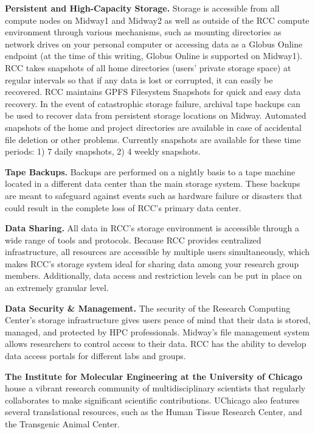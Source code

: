 \documentclass[onecolumn, compsoc,12pt]{IEEEtran}
\begin{document}
\textbf{Persistent and High-Capacity Storage.} Storage is accessible from all compute nodes on Midway1 and Midway2 as well as outside of the RCC compute environment through various mechanisms, such as mounting directories as network drives on your personal computer or accessing data as a Globus Online endpoint (at the time of this writing, Globus Online is supported on Midway1). RCC takes snapshots of all home directories (users' private storage space) at regular intervals so that if any data is lost or corrupted, it can easily be recovered. RCC maintains GPFS Filesystem Snapshots for quick and easy data recovery.  In the event of catastrophic storage failure, archival tape backups can be used to recover data from persistent storage locations on Midway. Automated snapshots of the home and project directories are available in case of accidental file deletion or other problems. Currently snapshots are available for these time periods: 1) 7 daily snapshots, 2) 4 weekly snapshots.

\textbf{Tape Backups.} Backups are performed on a nightly basis to a tape machine located in a different data center than the main storage system. These backups are meant to safeguard against events such as hardware failure or disasters that could result in the complete loss of RCC’s primary data center.


\textbf{Data Sharing.} All data in RCC’s storage environment is accessible through a wide range of tools and protocols. Because RCC provides centralized infrastructure, all resources are accessible by multiple users simultaneously, which makes RCC’s storage system ideal for sharing data among your research group members. Additionally, data access and restriction levels can be put in place on an extremely granular level.

\textbf{Data Security \& Management.} The security of the Research Computing Center’s storage infrastructure gives users peace of mind that their data is stored, managed, and protected by HPC professionals. Midway’s file management system allows researchers to control access to their data. RCC has the ability to develop data access portals for different labs and groups.




\textbf{The Institute for Molecular Engineering at the University of Chicago} house a vibrant research community of multidisciplinary scientists that regularly collaborates to make significant scientific contributions. UChicago also features several translational resources, such as the Human Tissue Research Center, and the Transgenic Animal Center. 
\end{document}
